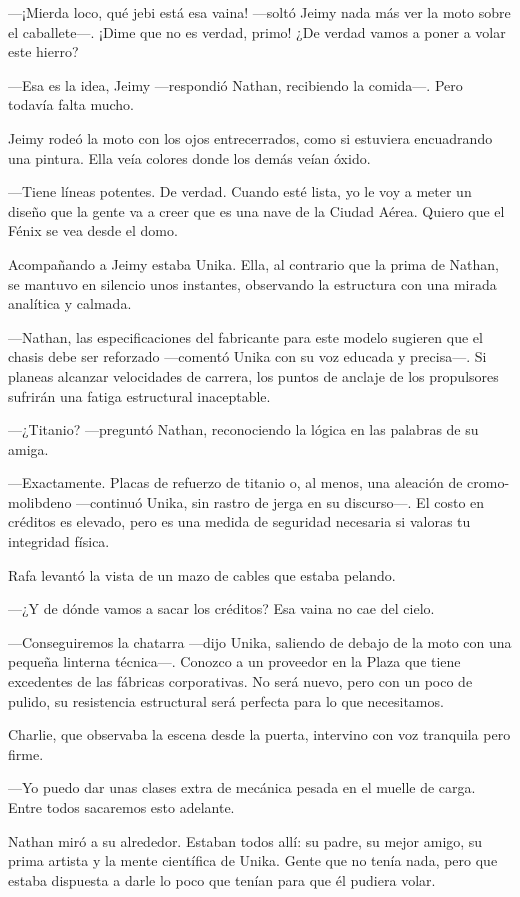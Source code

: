 \documentclass[12pt,a4paper]{book}
\begin{document}
---¡Mierda loco, qué jebi está esa vaina! ---soltó Jeimy nada más ver la moto sobre el caballete---. ¡Dime que no es verdad, primo! ¿De verdad vamos a poner a volar este hierro?

---Esa es la idea, Jeimy ---respondió Nathan, recibiendo la comida---. Pero todavía falta mucho.

Jeimy rodeó la moto con los ojos entrecerrados, como si estuviera encuadrando una pintura. Ella veía colores donde los demás veían óxido.

---Tiene líneas potentes. De verdad. Cuando esté lista, yo le voy a meter un diseño que la gente va a creer que es una nave de la Ciudad Aérea. Quiero que el Fénix se vea desde el domo.

Acompañando a Jeimy estaba Unika. Ella, al contrario que la prima de Nathan, se mantuvo en silencio unos instantes, observando la estructura con una mirada analítica y calmada.

---Nathan, las especificaciones del fabricante para este modelo sugieren que el chasis debe ser reforzado ---comentó Unika con su voz educada y precisa---. Si planeas alcanzar velocidades de carrera, los puntos de anclaje de los propulsores sufrirán una fatiga estructural inaceptable.

 ---¿Titanio? ---preguntó Nathan, reconociendo la lógica en las palabras de su amiga.

 ---Exactamente. Placas de refuerzo de titanio o, al menos, una aleación de cromo-molibdeno ---continuó Unika, sin rastro de jerga en su discurso---. El costo en créditos es elevado, pero es una medida de seguridad necesaria si valoras tu integridad física.

Rafa levantó la vista de un mazo de cables que estaba pelando.

---¿Y de dónde vamos a sacar los créditos? Esa vaina no cae del cielo.

---Conseguiremos la chatarra ---dijo Unika, saliendo de debajo de la moto con una pequeña linterna técnica---. Conozco a un proveedor en la Plaza que tiene excedentes de las fábricas corporativas. No será nuevo, pero con un poco de pulido, su resistencia estructural será perfecta para lo que necesitamos.

Charlie, que observaba la escena desde la puerta, intervino con voz tranquila pero firme.

---Yo puedo dar unas clases extra de mecánica pesada en el muelle de carga. Entre todos sacaremos esto adelante.

Nathan miró a su alrededor. Estaban todos allí: su padre, su mejor amigo, su prima artista y la mente científica de Unika. Gente que no tenía nada, pero que estaba dispuesta a darle lo poco que tenían para que él pudiera volar.
\end{document}
